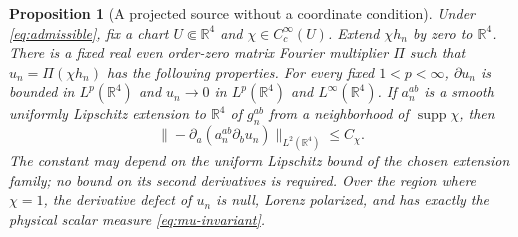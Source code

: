\documentclass[11pt,a4paper]{article}
\numberwithin{equation}{section}
\newcommand{\supp}{\operatorname{supp}}
\newcommand{\R}{\mathbb R}
\newtheorem{proposition}[theorem]{Proposition}
\theoremstyle{definition}
\begin{document}
\begin{proposition}[A projected source without a coordinate condition]
\label{prop:general-projection}
Under \eqref{eq:admissible}, fix a chart $U\Subset\R^4$ and
$\chi\in C_c^\infty(U)$. Extend $\chi h_n$ by zero to $\R^4$. There is a fixed real even order-zero matrix Fourier multiplier
$\Pi$ such that $u_n=\Pi(\chi h_n)$ has the following properties.
For every fixed $1<p<\infty$, $\partial u_n$ is bounded in $L^p(\R^4)$ and
$u_n\to0$ in $L^p(\R^4)$ and $L^\infty(\R^4)$. If $a_n^{ab}$ is a smooth uniformly
Lipschitz extension to $\R^4$ of $g_n^{ab}$ from a neighborhood of $\supp\chi$, then
\begin{equation}\label{eq:general-bounded-source}
\big\|-\partial_a(a_n^{ab}\partial_bu_n)\big\|_{L^2(\R^4)}\leq C_\chi.
\end{equation}
The constant may depend on the uniform Lipschitz bound of the chosen
extension family; no bound on its second derivatives is required.
Over the region where $\chi=1$, the derivative defect of $u_n$ is null,
Lorenz polarized, and has exactly the physical scalar measure
\eqref{eq:mu-invariant}.
\end{proposition}
\end{document}

